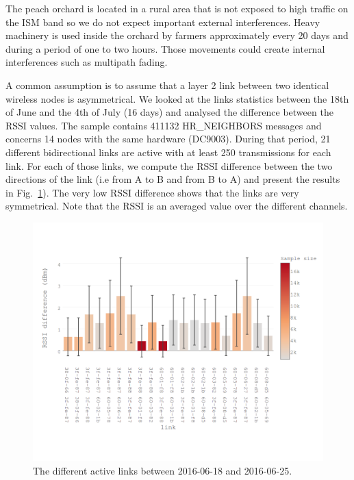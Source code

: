 \documentclass{sig-alternate}
\begin{document}

The peach orchard is located in a rural area that is not exposed to high traffic on the ISM band so we do not expect important external interferences.
Heavy machinery is used inside the orchard by farmers approximately every 20 days and during a period of one to two hours.
Those movements could create internal interferences such as multipath fading.


A common assumption is to assume that a layer 2 link between two identical wireless nodes is asymmetrical.
We looked at the links statistics between the 18th of June and the 4th of July (16 days) and analysed the difference between the RSSI values.
The sample contains 411132 HR\_NEIGHBORS messages and concerns 14 nodes with the same hardware (DC9003).
During that period, 21 different bidirectional links are active with at least 250 transmissions for each link.
For each of those links, we compute the RSSI difference between the two directions of the link (i.e from A to B and from B to A) and present the results in Fig.~\ref{fig:tab_symmetry}).
The very low RSSI difference shows that the links are very symmetrical.
Note that the RSSI is an averaged value over the different channels.

\begin{figure}
    \centering
    \includegraphics[width=\columnwidth]{sym_plot}
    \caption{The different active links between 2016-06-18 and 2016-06-25.}
    \label{fig:tab_symmetry}
\end{figure}
\end{document}

